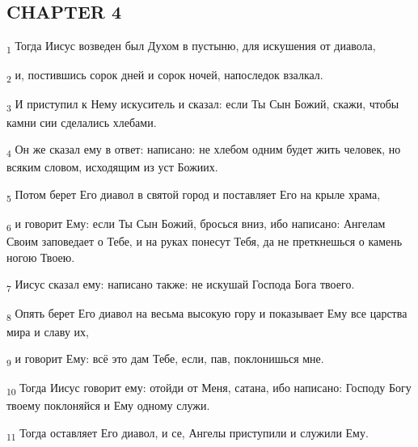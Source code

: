 \subsection{CHAPTER 4}
\begin{tcolorbox}
\textsubscript{1} Тогда Иисус возведен был Духом в пустыню, для искушения от диавола,
\end{tcolorbox}
\begin{tcolorbox}
\textsubscript{2} и, постившись сорок дней и сорок ночей, напоследок взалкал.
\end{tcolorbox}
\begin{tcolorbox}
\textsubscript{3} И приступил к Нему искуситель и сказал: если Ты Сын Божий, скажи, чтобы камни сии сделались хлебами.
\end{tcolorbox}
\begin{tcolorbox}
\textsubscript{4} Он же сказал ему в ответ: написано: не хлебом одним будет жить человек, но всяким словом, исходящим из уст Божиих.
\end{tcolorbox}
\begin{tcolorbox}
\textsubscript{5} Потом берет Его диавол в святой город и поставляет Его на крыле храма,
\end{tcolorbox}
\begin{tcolorbox}
\textsubscript{6} и говорит Ему: если Ты Сын Божий, бросься вниз, ибо написано: Ангелам Своим заповедает о Тебе, и на руках понесут Тебя, да не преткнешься о камень ногою Твоею.
\end{tcolorbox}
\begin{tcolorbox}
\textsubscript{7} Иисус сказал ему: написано также: не искушай Господа Бога твоего.
\end{tcolorbox}
\begin{tcolorbox}
\textsubscript{8} Опять берет Его диавол на весьма высокую гору и показывает Ему все царства мира и славу их,
\end{tcolorbox}
\begin{tcolorbox}
\textsubscript{9} и говорит Ему: всё это дам Тебе, если, пав, поклонишься мне.
\end{tcolorbox}
\begin{tcolorbox}
\textsubscript{10} Тогда Иисус говорит ему: отойди от Меня, сатана, ибо написано: Господу Богу твоему поклоняйся и Ему одному служи.
\end{tcolorbox}
\begin{tcolorbox}
\textsubscript{11} Тогда оставляет Его диавол, и се, Ангелы приступили и служили Ему.
\end{tcolorbox}
